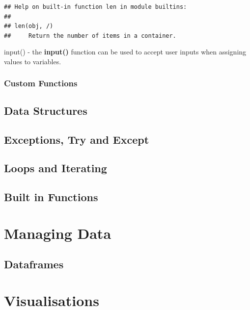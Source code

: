 \documentclass[
]{book}
\begin{document}
\begin{verbatim}
## Help on built-in function len in module builtins:
## 
## len(obj, /)
##     Return the number of items in a container.
\end{verbatim}

input() - the \textbf{input()} function can be used to accept user inputs when assigning values to variables.

\hypertarget{custom-functions}{%
\subsubsection{Custom Functions}\label{custom-functions}}

\hypertarget{data-structures}{%
\subsection{Data Structures}\label{data-structures}}

\hypertarget{exceptions-try-and-except}{%
\subsection{Exceptions, Try and Except}\label{exceptions-try-and-except}}

\hypertarget{loops-and-iterating}{%
\subsection{Loops and Iterating}\label{loops-and-iterating}}

\hypertarget{built-in-functions}{%
\subsection{Built in Functions}\label{built-in-functions}}

\hypertarget{managing-data}{%
\section{Managing Data}\label{managing-data}}

\hypertarget{dataframes}{%
\subsection{Dataframes}\label{dataframes}}

\hypertarget{visualisations}{%
\section{Visualisations}\label{visualisations}}
\end{document}
